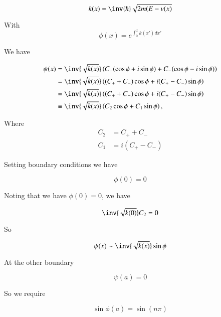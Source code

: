 \begin{equation}\label{eqn:qmTwoR3:50}
k(x) = \inv{\hbar} \sqrt{ 2m( E - v(x) }
\end{equation}

With
\begin{equation}\label{eqn:qmTwoR3:70}
\phi(x) = e^{\int_0^x k(x') dx'}
\end{equation}

We have

\begin{align*}
\psi(x) 
&= \inv{\sqrt{k(x)}} \left( 
C_{+}(\cos \phi + i\sin\phi) + C_{-}(\cos\phi - i \sin\phi)
\right) \\
&= \inv{\sqrt{k(x)}} \left( 
(C_{+} + C_{-})\cos \phi + i(C_{+} - C_{-}) \sin\phi
\right) \\
&= \inv{\sqrt{k(x)}} \left( 
(C_{+} + C_{-})\cos \phi + i(C_{+} - C_{-}) \sin\phi
\right) \\
&\equiv 
\inv{\sqrt{k(x)}} \left( 
C_2 \cos \phi + C_1 \sin\phi
\right),
\end{align*}

Where
\begin{align}\label{eqn:qmTwoR3:85}
C_2 &= C_{+} + C_{-} \\
C_1 &= i( C_{+} - C_{-})
\end{align}

Setting boundary conditions we have

\begin{equation}\label{eqn:qmTwoR3:90}
\phi(0) = 0
\end{equation}

Noting that we have $\phi(0) = 0$, we have

\begin{equation}\label{eqn:qmTwoR3:110}
\inv{\sqrt{k(0)}} C_2 = 0
\end{equation}

So

\begin{equation}\label{eqn:qmTwoR3:130}
\psi(x) 
\sim
\inv{\sqrt{k(x)}} \sin\phi
\end{equation}

At the other boundary

\begin{equation}\label{eqn:qmTwoR3:150}
\psi(a) = 0
\end{equation}

So we require

\begin{equation}\label{eqn:qmTwoR3:170}
\sin \phi(a) = \sin(n \pi)
\end{equation}


